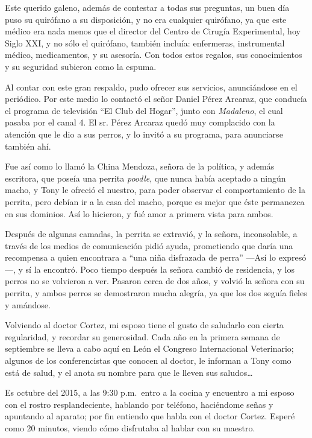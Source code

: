 \documentclass[letterpaper, 12pt]{book}
\begin{document}
Este querido galeno, además de contestar a todas sus preguntas, un buen día puso su quirófano a su disposición, y no era cualquier quirófano, ya que este médico era nada menos que el director del Centro de Cirugía Experimental, hoy Siglo XXI, y no sólo el quirófano, también incluía: enfermeras, instrumental médico, medicamentos, y su asesoría. Con todos estos regalos, sus conocimientos y su seguridad subieron como la espuma.

Al contar con este gran respaldo, pudo ofrecer sus servicios, anunciándose en el periódico. Por este medio lo contactó el señor Daniel Pérez Arcaraz, que conducía el programa de televisión ``El Club del Hogar'', junto con \textit{Madaleno}, el cual pasaba por el canal 4. El sr. Pérez Arcaraz quedó muy complacido con la atención que le dio a sus perros, y lo invitó a su programa, para anunciarse también ahí. 

Fue así como lo llamó la China Mendoza, señora de la política, y además escritora, que poseía una perrita \textit{poodle}, que nunca había aceptado a ningún macho, y Tony le ofreció el nuestro, para poder observar el comportamiento de la perrita, pero debían ir a la casa del macho, porque es mejor que éste permanezca en sus dominios. Así lo hicieron, y fué amor a primera vista para ambos.

Después de algunas camadas, la perrita se extravió, y la señora, inconsolable, a través de los medios de comunicación pidió ayuda, prometiendo que daría una recompensa a quien encontrara a ``una niña disfrazada de perra'' ---Así lo expresó---, y sí la encontró. Poco tiempo después la señora cambió de residencia, y los perros no se volvieron a ver. Pasaron cerca de dos años, y volvió la señora con su perrita, y ambos perros se demostraron mucha alegría, ya que los dos seguía fieles y amándose.

Volviendo al doctor Cortez, mi esposo tiene el gusto de saludarlo con cierta regularidad, y recordar su generosidad. Cada año en la primera semana de septiembre se lleva a cabo aquí en León el Congreso Internacional Veterinario; algunos de los conferencistas que conocen al doctor, le informan a Tony como está de salud, y el anota su nombre para que le lleven sus saludos\ldots

Es octubre del 2015, a las 9:30 p.m.\ entro a la cocina y encuentro a mi esposo con el rostro resplandeciente, hablando por teléfono, haciéndome señas y apuntando al aparato; por fin entiendo que habla con el doctor Cortez. Esperé como 20 minutos, viendo cómo disfrutaba al hablar con su maestro.
\end{document}
